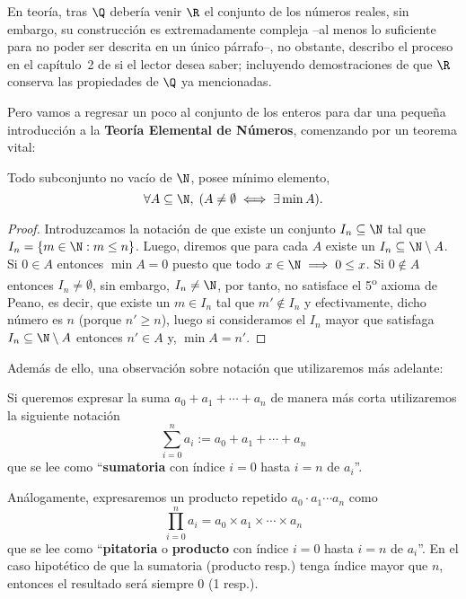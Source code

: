 \documentclass[11pt,oneside]{book}
\begin{document}
En teoría, tras $\Q$ debería venir $\R$ el conjunto de los números reales, sin embargo, su construcción es extremadamente compleja --al menos lo suficiente para no poder ser descrita en un único párrafo--, no obstante, describo el proceso en el capítulo~2 de \cite{hohlen2019analisis} si el lector desea saber; incluyendo demostraciones de que $\R$ conserva las propiedades de $\Q$ ya mencionadas.

Pero vamos a regresar un poco al conjunto de los enteros para dar una pequeña introducción a la \textbf{Teoría Elemental de Números}, comenzando por un teorema vital:
\begin{thm}
Todo subconjunto no vacío de $\N$, posee mínimo elemento,
$$\forall A\subseteq\N,\;(A\neq\emptyset\iff\exists\min A).$$
\end{thm}
\begin{proof}
Introduzcamos la notación de que existe un conjunto $I_n\subseteq\N$ tal que $I_n=\{m\in\N:m\leq n\}$. Luego, diremos que para cada $A$ existe un $I_n\subseteq\N\setminus A$. Si $0\in A$ entonces $\min A=0$ puesto que todo $x\in\N\implies 0\leq x$. Si $0\notin A$ entonces $I_n\neq\emptyset$, sin embargo, $I_n\neq\N$, por tanto, no satisface el 5\textsuperscript{o} axioma de Peano, es decir, que existe un $m\in I_n$ tal que $m'\notin I_n$ y efectivamente, dicho número es $n$ (porque $n'\geq n$), luego si consideramos el $I_n$ mayor que satisfaga $I_n\subseteq\N\setminus A$ entonces $n'\in A$ y, $\min A=n'$.
\end{proof}
Además de ello, una observación sobre notación que utilizaremos más adelante:
\begin{mydef}
Si queremos expresar la suma $a_0+a_1+\cdots+a_n$ de manera más corta utilizaremos la siguiente notación
$$\sum_{i=0}^n a_i:=a_0+a_1+\cdots+a_n$$
que se lee como ``\textbf{sumatoria} con índice $i=0$ hasta $i=n$ de $a_i$''.

Análogamente, expresaremos un producto repetido $a_0\cdot a_1\cdots a_n$ como
$$\prod_{i=0}^n a_i=a_0\times a_1\times\cdots\times a_n$$
que se lee como ``\textbf{pitatoria} o \textbf{producto} con índice $i=0$ hasta $i=n$ de $a_i$''. En el caso hipotético de que la sumatoria (producto resp.) tenga índice mayor que $n$, entonces el resultado será siempre 0 (1 resp.). 
\end{mydef}
\end{document}

